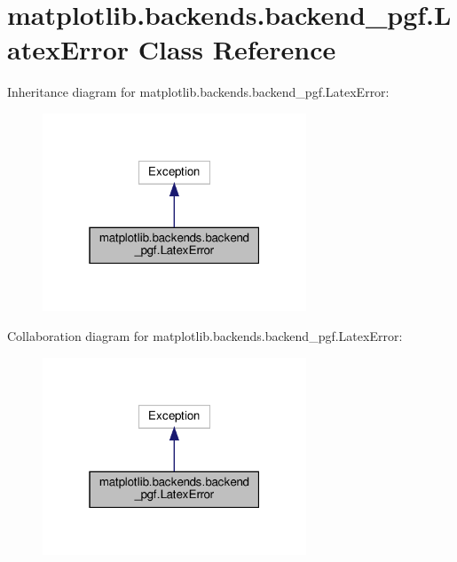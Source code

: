\hypertarget{classmatplotlib_1_1backends_1_1backend__pgf_1_1LatexError}{}\section{matplotlib.\+backends.\+backend\+\_\+pgf.\+Latex\+Error Class Reference}
\label{classmatplotlib_1_1backends_1_1backend__pgf_1_1LatexError}


Inheritance diagram for matplotlib.\+backends.\+backend\+\_\+pgf.\+Latex\+Error\+:
\nopagebreak
\begin{figure}[H]
\begin{center}
\leavevmode
\includegraphics[width=223pt]{classmatplotlib_1_1backends_1_1backend__pgf_1_1LatexError__inherit__graph}
\end{center}
\end{figure}


Collaboration diagram for matplotlib.\+backends.\+backend\+\_\+pgf.\+Latex\+Error\+:
\nopagebreak
\begin{figure}[H]
\begin{center}
\leavevmode
\includegraphics[width=223pt]{classmatplotlib_1_1backends_1_1backend__pgf_1_1LatexError__coll__graph}
\end{center}
\end{figure}
